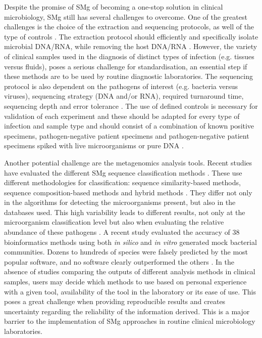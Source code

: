 Despite the promise of SMg of becoming a one-stop solution in clinical microbiology, SMg still has several challenges to overcome. 
One of the greatest challenges is the choice of the extraction and sequencing protocols, as well of the type of controls \citep{schlaberg_validation_2017}. 
The extraction protocol should efficiently and specifically isolate microbial DNA/RNA, while removing the host DNA/RNA \citep{street_molecular_2017}. 
However, the variety of clinical samples used in the diagnosis of distinct types of infection (e.g. tissues versus fluids), poses a serious challenge for standardisation, an essential step if these methods are to be used by routine diagnostic laboratories. 
The sequencing protocol is also dependent on the pathogens of interest (e.g. bacteria versus viruses), sequencing strategy (DNA and/or RNA), required turnaround time, sequencing depth and error tolerance \citep{schlaberg_validation_2017}. The use of defined controls is necessary for validation of each experiment and these should be adapted for every type of infection and sample type and should consist of a combination of known positive specimens, pathogen-negative patient specimens and pathogen-negative patient specimens spiked with live microorganisms or pure DNA \citep{schlaberg_validation_2017}.

Another potential challenge are the metagenomics analysis tools. 
Recent studies have evaluated the different SMg sequence classification methods \citep{peabody_evaluation_2015}. 
These use different methodologies for classification: sequence similarity-based methods, sequence composition-based methods and hybrid methods \citep{peabody_evaluation_2015}. 
They differ not only in the algorithms for detecting the microorganisms present, but also in the databases used. 
This high variability leads to different results, not only at the microorganism classification level but also when evaluating the relative abundance of these pathogens \citep{peabody_evaluation_2015}. 
A recent study evaluated the accuracy of 38 bioinformatics methods using both \textit{in silico} and \textit{in vitro} generated mock bacterial communities.
Dozens to hundreds of species were falsely predicted by the most popular software, and no software clearly outperformed the others \citep{peabody_evaluation_2015}. 
In the absence of studies comparing the outputs of different analysis methods in clinical samples, users may decide which methods to use based on personal experience with a given tool, availability of the tool in the laboratory or its ease of use.
This poses a great challenge when providing reproducible results and creates uncertainty regarding the reliability of the information derived. This is a major barrier to the implementation of SMg approaches in routine clinical microbiology laboratories.

